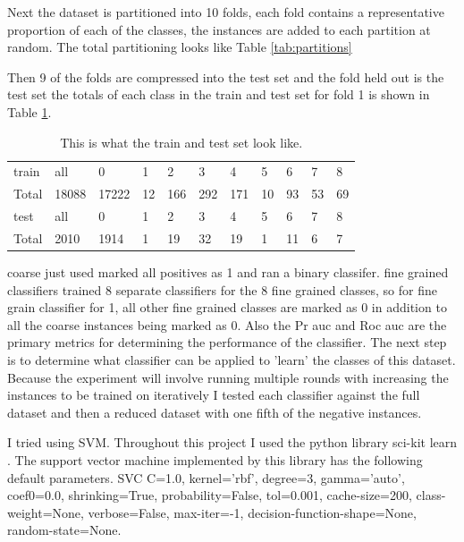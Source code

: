 \documentclass[ms]{nuthesis}
\begin{document}
\par Next the dataset is partitioned into 10 folds, each fold contains a representative proportion
of each of the classes, the instances are added to each partition at random. The total partitioning
looks like Table \ref{tab:partitions}


\par Then 9 of the folds are compressed into the test set and the fold held out
is the test set the totals of each class in the train and test set for fold 1 is shown in
Table \ref{tab:TrainTest}.


\FloatBarrier
\begin{table}[h]
  \centering
  \begin{tabular}{|l||l||l||l||l||l||l||l||l||l||l|}\toprule
    train & all & 0 & 1 & 2 & 3 & 4 & 5 & 6 & 7 & 8 \\
    Total & 18088 & 17222 & 12 & 166 & 292 & 171 & 10 & 93 & 53 & 69 \\ \midrule
    test & all &  0 & 1 & 2 & 3 & 4 & 5 & 6 & 7 & 8 \\
    Total & 2010 & 1914 & 1 & 19 & 32 & 19 & 1 & 11 & 6 & 7 \\
 \bottomrule
  \end{tabular}
  \caption{This is what the train and test set look like.}
  \label{tab:TrainTest}
\end{table}
\FloatBarrier

\par coarse just used marked all positives as 1 and ran a binary classifer.
 fine grained classifiers trained 8 separate classifiers for the 8 fine grained
classes, so for fine grain classifier for 1, all other fine grained classes are marked as 0
in addition to all the coarse instances being marked as 0. Also the Pr auc and Roc auc are the
primary metrics for determining the performance
of the classifier. The next step is to determine what classifier can be applied to 'learn' the classes of
this dataset. Because the experiment will involve running multiple rounds with increasing the instances to
be trained on iteratively I tested each classifier against the full dataset and then a reduced
dataset with one fifth of the negative instances.

\par I tried using SVM. Throughout this project I used the python library sci-kit learn \cite{scikit-learn}.
The support vector machine implemented by this library has the following default parameters. SVC C=1.0,
kernel='rbf', degree=3, gamma='auto', coef0=0.0, shrinking=True, probability=False, tol=0.001, cache-size=200,
class-weight=None, verbose=False, max-iter=-1, decision-function-shape=None, random-state=None.
\end{document}

